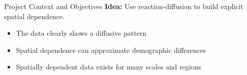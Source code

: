\begin{slide}{Project Context and Objectives}
	{\large \textbf{Idea:} Use reaction-diffusion to build explicit spatial dependence.}
	\begin{itemize}
		\item The data clearly shows a diffusive pattern
		\item Spatial dependence can approximate demographic differences
		\item Spatially dependent data exists for many scales and regions
	\end{itemize}
\end{slide}